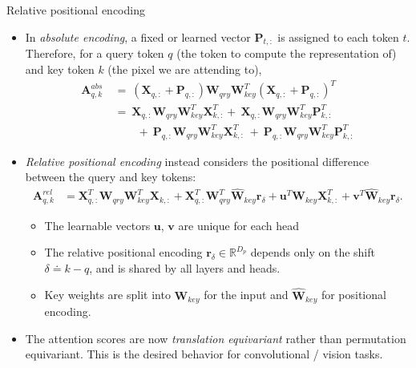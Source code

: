 \documentclass[9pt]{beamer}
\newcommand{\bb}{\mathbb}
\newcommand{\mb}{\bm}
\begin{document}
\newcommand{\WW}{ \mb W_{qry}\mb W_{key}^T }
\begin{frame}{Relative positional encoding}
\begin{itemize}
\item In {\em absolute encoding}, a fixed or learned vector $\bm P_{t,:}$ is assigned to each token $t$. Therefore, for a query token $q$ (the token to compute the representation of) and key token $k$ (the pixel we are attending to),
\begin{align}
    \mb A^{abs}_{q, k} 
        \ &=\ (\mb X_{q,:} + \mb P_{q,:})\WW(\mb X_{q,:} + \mb P_{q,:})^T 
        \nonumber
        \\ &=\ \mb X_{q,:}\WW\mb X^T_{k,:} +\ \mb X_{q,:}\WW\mb P^T_{k,:} 
        \\ &\qquad +\ \mb P_{q,:}\WW\mb X^T_{k,:} \ +\ \mb P_{q,:}\WW\mb P^T_{k,:} \nonumber 
\end{align}

\item \emph{Relative positional encoding} instead considers the positional difference between the query and key tokens:
\vspace{-.05in}
\begin{align}
    \mb A^{rel}_{q, k} &= 
        \mb X_{q,:}^T \WW \mb X_{k,:}
        + \mb X_{q,:}^T \mb W_{qry}^T\hat{\mb W}_{key} \mb r_{\delta}
        + \mb u^T \mb W_{key} \mb X^T_{k,:}
        + \mb v^T \hat{\mb W}_{key} \mb r_{\delta}.
    \label{relposenc}
\end{align}
\vspace{-.18in}
\begin{itemize}
    \item The learnable vectors $\bm u$, $\bm v$ are unique for each head 
    \item The relative positional encoding $\bm r_{\delta} \in \bb R^{D_p}$ depends only on the shift $\delta \doteq k -q$, and is shared by all layers and heads.
    \item Key weights are split into $\bm W_{key}$ for the input and $\hat{\bm W}_{key}$ for positional encoding.
\end{itemize}

\item The attention scores are now {\em translation equivariant} rather than permutation equivariant. This is the desired behavior for convolutional / vision tasks.
\end{itemize}
\end{frame}
\end{document}
